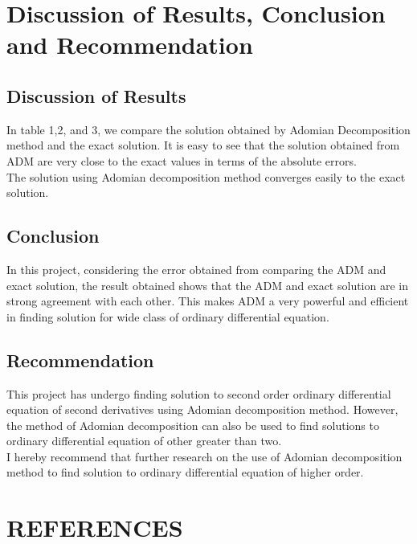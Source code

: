 \documentclass[11pt]{report}
\newcommand{\NI}{\noindent}
\begin{document}
	\chapter{Discussion of Results, Conclusion and Recommendation}
	\section{Discussion of Results}
	In table 1,2, and 3, we compare the solution obtained by Adomian Decomposition method and the exact solution. It is easy to see that the solution obtained from ADM are very close to the exact values in terms of the absolute errors.\\
	
	\NI The solution using Adomian decomposition method converges easily to the exact solution.
	
	\section{Conclusion}
	In this project, considering the error obtained from comparing the ADM and exact solution, the result obtained shows that the ADM and exact solution are in strong agreement with each other. This makes ADM a very powerful and efficient in finding solution for wide class of ordinary differential equation.
	
	\section{Recommendation}
	This project has undergo finding solution to second order ordinary differential equation of second derivatives using Adomian decomposition method. However, the method of Adomian decomposition can also be used to find solutions to ordinary differential equation of other greater than two.\\
	
	\NI I hereby recommend that further research on the use of Adomian decomposition method to find solution to ordinary differential equation of higher order.

	
	\chapter*{REFERENCES}
	
\end{document}
